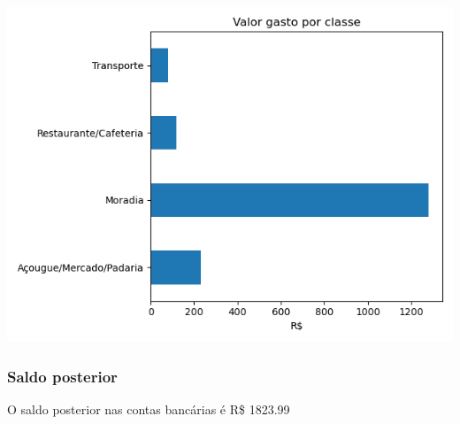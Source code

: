 \documentclass[11pt]{article}
\begin{document}
\begin{center}
\includegraphics[width=.9\linewidth]{outubro-classe.png}
\end{center}

\subsubsection{Saldo posterior}
\label{sec:orgc3992e5}

O saldo posterior nas contas bancárias é R\$ 1823.99
\end{document}
